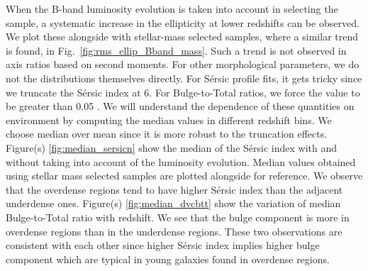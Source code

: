 \documentclass[twocolumn,useAMS,usenatbib]{mn2e}
\newcommand{\arun}[1]{}
\newcommand{\sersic}{S\'{e}rsic }
\newcommand{\btt}{Bulge-to-Total }
\begin{document}
When the B-band luminosity evolution is taken into account in selecting the sample, a systematic increase in the ellipticity at lower redshifts can be observed. We plot these alongside with stellar-mass selected samples, where a similar trend is found, in Fig.~\ref{fig:rms_ellip_Bband_mass}. 
Such a trend is not observed in axis ratios based on second moments. 
For other morphological parameters, we do not the distributions themselves directly. For \sersic profile fits, it gets tricky since we truncate the \sersic index at 6. 
For \btt ratios, we force the value to be greater than 0.05 \arun{What exactly do we do here?}. We will understand the dependence of these quantities on environment by computing the median values in different redshift bins.
We choose median over mean since it is more robust to the truncation effects.
Figure(s) \ref{fig:median_sersicn} show the median of the \sersic index with and without taking into account of the luminosity evolution. Median values obtained using stellar mass selected samples are plotted alongside for reference.
We observe that the overdense regions tend to have higher \sersic index than the adjacent underdense ones.
Figure(s) \ref{fig:median_dvcbtt} show the variation of median \btt ratio with redshift. We see that the bulge component is more in overdense regions than in the underdense regions.
These two observations are consistent with each other since higher \sersic index implies higher bulge component which are typical in young galaxies found in overdense regions.
\end{document}
